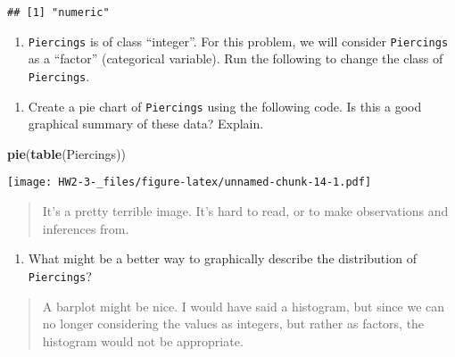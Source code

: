 \documentclass[]{article}
\newenvironment{Shaded}{\begin{snugshade}}{\end{snugshade}}
\newcommand{\KeywordTok}[1]{\textcolor[rgb]{0.13,0.29,0.53}{\textbf{#1}}}
\newcommand{\NormalTok}[1]{#1}
\newcommand{\OperatorTok}[1]{\textcolor[rgb]{0.81,0.36,0.00}{\textbf{#1}}}
\newcommand{\StringTok}[1]{\textcolor[rgb]{0.31,0.60,0.02}{#1}}
\providecommand{\tightlist}{%
  \setlength{\itemsep}{0pt}\setlength{\parskip}{0pt}}
\begin{document}
\begin{verbatim}
## [1] "numeric"
\end{verbatim}

\begin{enumerate}
\def\labelenumi{\alph{enumi})}
\setcounter{enumi}{1}
\tightlist
\item
  \texttt{Piercings} is of class ``integer''. For this problem, we will
  consider \texttt{Piercings} as a ``factor'' (categorical variable).
  Run the following to change the class of \texttt{Piercings}.
\end{enumerate}

\begin{Shaded}
\end{Shaded}

\begin{enumerate}
\def\labelenumi{\alph{enumi})}
\setcounter{enumi}{2}
\tightlist
\item
  Create a pie chart of \texttt{Piercings} using the following code. Is
  this a good graphical summary of these data? Explain.
\end{enumerate}

\begin{Shaded}
\begin{Highlighting}[]
\KeywordTok{pie}\NormalTok{(}\KeywordTok{table}\NormalTok{(Piercings))}
\end{Highlighting}
\end{Shaded}

\texttt{[image: HW2-3-\_files/figure-latex/unnamed-chunk-14-1.pdf]}

\begin{quote}
It's a pretty terrible image. It's hard to read, or to make observations
and inferences from.
\end{quote}

\begin{enumerate}
\def\labelenumi{\alph{enumi})}
\setcounter{enumi}{3}
\tightlist
\item
  What might be a better way to graphically describe the distribution of
  \texttt{Piercings}?
\end{enumerate}

\begin{quote}
A barplot might be nice. I would have said a histogram, but since we can
no longer considering the values as integers, but rather as factors, the
histogram would not be appropriate.
\end{quote}
\end{document}
